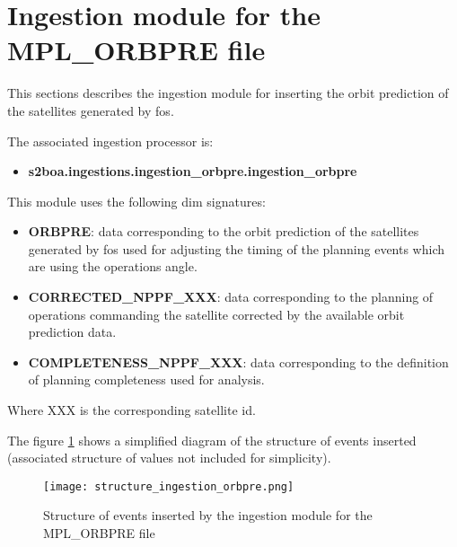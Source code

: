 \section{Ingestion module for the MPL\_ORBPRE file}

This sections describes the ingestion module for inserting the orbit prediction of the satellites generated by \acrshort{fos}.

The associated ingestion processor is:

\begin{itemize} 

\item \textbf{s2boa.ingestions.ingestion\_orbpre.ingestion\_orbpre}
  
\end{itemize}

This module uses the following \acrshort{dim} signatures:

\begin{itemize} 

\item \textbf{ORBPRE}: data corresponding to the orbit prediction of the satellites generated by \acrshort{fos} used for adjusting the timing of the planning events which are using the operations angle.

\item \textbf{CORRECTED\_NPPF\_XXX}: data corresponding to the planning of operations commanding the satellite corrected by the available orbit prediction data.

\item \textbf{COMPLETENESS\_NPPF\_XXX}: data corresponding to the definition of planning completeness used for analysis.
  
\end{itemize}

Where XXX is the corresponding satellite id.

The figure \ref{fg:structure_ingestion_orbpre} shows a simplified diagram of the structure of events inserted (associated structure of values not included for simplicity).

\begin{figure}[H]
  \begin{center}
	\centering\texttt{[image: structure\_ingestion\_orbpre.png]}
	\caption{Structure of events inserted by the ingestion module for the MPL\_ORBPRE file}
	\label{fg:structure_ingestion_orbpre}
  \end{center}
\end{figure}

